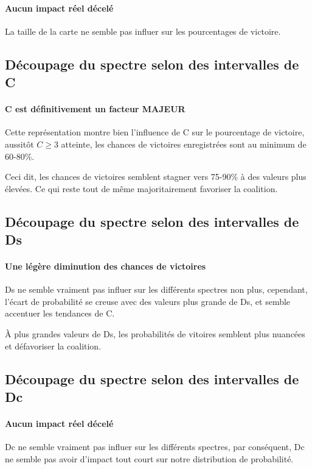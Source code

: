 \paragraph{Aucun impact réel décelé}
La taille de la carte ne semble pas influer sur les pourcentages de victoire.




\subsection{Découpage du spectre selon des intervalles de C}
\paragraph{C est définitivement un facteur MAJEUR}
Cette représentation montre bien l'influence de C sur le pourcentage de victoire, aussitôt $C \ge 3$ atteinte, les chances de victoires enregistrées sont au minimum de 60-80\%.

Ceci dit, les chances de victoires semblent stagner vers 75-90\% à des valeurs plus élevées. Ce qui reste tout de même majoritairement favoriser la coalition.



\subsection{Découpage du spectre selon des intervalles de Ds}
\paragraph{Une légère diminution des chances de victoires}
Ds ne semble vraiment pas influer sur les différents spectres non plus, cependant, l'écart de probabilité se creuse avec des valeurs plus grande de Ds, et semble accentuer les tendances de C.

À plus grandes valeurs de Ds, les probabilités de vitoires semblent plus nuancées et défavoriser la coalition.


\subsection{Découpage du spectre selon des intervalles de Dc}
\paragraph{Aucun impact réel décelé}
Dc ne semble vraiment pas influer sur les différents spectres, par conséquent, Dc ne semble pas avoir d'impact tout court sur notre distribution de probabilité.



